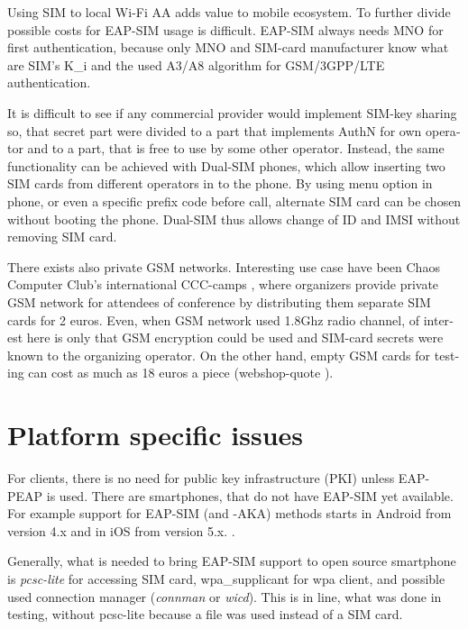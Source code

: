 \documentclass[12pt,a4paper,english]{tutthesis}
\begin{document}
\begin{otherlanguage}{english}
Using SIM to local Wi-Fi AA adds value to mobile ecosystem.
To further divide possible costs for EAP-SIM usage
is difficult.
EAP-SIM always needs MNO for first authentication,
because only MNO and SIM-card manufacturer know 
what are SIM's K\_i and the used A3/A8 algorithm
for GSM/3GPP/LTE authentication.

It is difficult to see if any commercial provider would implement
SIM-key sharing so, that secret part were divided to a part that
implements AuthN for own operator and to a part, that is free to use by
some other operator.  Instead, the same functionality can be achieved with
Dual-SIM phones, which allow inserting two SIM cards from different
operators in to the phone. By using menu option in phone, or even a
specific prefix code before call, alternate SIM card can be chosen
without booting the phone.
Dual-SIM thus allows change of ID and IMSI without removing SIM card.

There exists also private GSM networks.
Interesting use case have been Chaos Computer Club's international 
CCC-camps \cite{ccc}, where organizers 
provide private GSM network for attendees of conference
by distributing them separate SIM cards for 2 euros.
Even, when GSM network used 1.8Ghz radio channel, of interest here is
only that GSM encryption could be used and SIM-card secrets were known to
the organizing operator.
On the other hand, empty GSM cards for testing can cost as much as 
18 euros a piece (webshop-quote \cite{smartjac-testsim}).


\section{Platform specific issues}
\label{sec-6-4}

For clients, there is no need for public key infrastructure (PKI) 
unless EAP-PEAP is used.
There are smartphones, that do not have EAP-SIM yet available.
For example support for
EAP-SIM (and -AKA) methods starts in Android from version 4.x and in
iOS from version 5.x. \cite{sim-support}.


Generally, what is  needed to bring EAP-SIM support to open source
smartphone is \emph{pcsc-lite} for accessing SIM card, wpa\_supplicant for
wpa client, and possible used connection manager (\emph{connman} or
\emph{wicd}). This is in line, what was done in testing, without pcsc-lite
because a file was used instead of a SIM card.






\end{otherlanguage}
\end{document}
